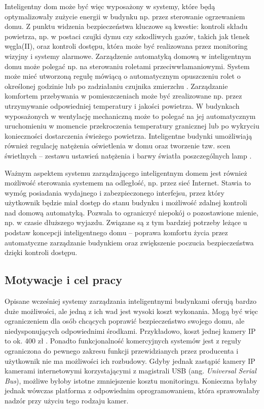 \documentclass[a4paper,11pt,twoside]{article}
\begin{document}
Inteligentny dom może być więc wyposażony w systemy, które będą optymalizowały zużycie energii w budynku np. przez sterowanie ogrzewaniem domu. Z punktu widzenia bezpieczeństwa kluczowe są kwestie: kontroli składu powietrza, np. w postaci czujki dymu czy szkodliwych gazów, takich jak tlenek węgla(II), oraz kontroli dostępu, która może być realizowana przez monitoring wizyjny i systemy alarmowe. Zarządzenie automatyką domową w inteligentnym domu może polegać np. na sterowaniu roletami przeciwwłamaniowymi. System może mieć utworzoną regułę mówiącą o automatycznym opuszczeniu rolet o określonej godzinie lub po zadziałaniu czujnika zmierzchu \cite{inteligentny_dom}. Zarządzanie komfortem przebywania w pomieszczeniach może być zrealizowane np. przez utrzymywanie odpowiedniej temperatury i jakości powietrza. W budynkach wyposażonych w wentylację mechaniczną może to polegać na jej automatycznym uruchomieniu w momencie przekroczenia temperatury granicznej lub po wykryciu konieczności dostarczenia świeżego powietrza. Inteligentne budynki umożliwiają również regulację natężenia oświetlenia w domu oraz tworzenie tzw. scen świetlnych -- zestawu ustawień natężenia i barwy światła poszczególnych lamp \cite{inteligentny_dom}.

Ważnym aspektem systemu zarządzającego inteligentnym domem jest również możliwość sterowania systemem na odległość, np. przez sieć Internet. Stawia to wymóg posiadania wydajnego i zabezpieczonego interfejsu, przez który użytkownik będzie miał dostęp do stanu budynku i możliwość zdalnej kontroli nad domową automatyką. Pozwala to ograniczyć niepokój o pozostawione mienie, np. w czasie dłuższego wyjazdu. Związane są z tym bardziej potrzeby leżące u podstaw koncepcji inteligentnego domu -- poprawa komfortu życia przez automatyczne zarządzanie budynkiem oraz zwiększenie poczucia bezpieczeństwa dzięki kontroli dostępu. 

\subsection{Motywacje i cel pracy}
Opisane wcześniej systemy zarządzania inteligentnymi budynkami oferują bardzo duże możliwości, ale jedną z ich wad jest wysoki koszt wykonania. Mogą być więc ograniczeniem dla osób chcących poprawić bezpieczeństwo swojego domu, ale niedysponujących odpowiednimi środkami. Przykładowo, koszt jednej kamery IP to ok. 400 zł \cite{komputer_świat}. Ponadto funkcjonalność komercyjnych systemów jest z reguły ograniczona do pewnego zakresu funkcji przewidzianych przez producenta i użytkownik nie ma możliwości ich rozbudowy. Gdyby jednak zastąpić kamery IP kamerami internetowymi korzystającymi z magistrali USB (ang. \textit{Universal Serial Bus}), możliwe byłoby istotne zmniejszenie kosztu monitoringu. Konieczna byłaby jednak wówczas platforma z odpowiednim oprogramowaniem, która sprawowałaby nadzór przy użyciu tego rodzaju kamer. 
\end{document}
